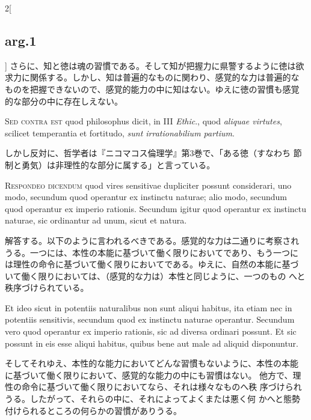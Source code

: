 \documentclass[paper=a4paper,fontsize=10pt,jafontsize=9pt,titlepage]{jlreq}
\begin{document}
\begin{paracol}{2}[\subsection{arg.1}]
さらに、知と徳は魂の習慣である。そして知が把握力に県警するように徳は欲
求力に関係する。しかし、知は普遍的なものに関わり、感覚的な力は普遍的な
ものを把握できないので、感覚的能力の中に知はない。ゆえに徳の習慣も感覚
的な部分の中に存在しえない。

\switchcolumn*[\subsection{s.c.}]

{\scshape Sed contra est} quod philosophus dicit, in III {\itshape
 Ethic}., quod {\itshape aliquae virtutes}, scilicet temperantia et
 fortitudo, {\itshape sunt irrationabilium partium}.

\switchcolumn

しかし反対に、哲学者は『ニコマコス倫理学』第3巻で、「ある徳（すなわち
 節制と勇気）は非理性的な部分に属する」と言っている。


{\scshape Respondeo dicendum} quod vires sensitivae dupliciter possunt
 considerari, uno modo, secundum quod operantur ex instinctu naturae;
 alio modo, secundum quod operantur ex imperio rationis. Secundum
 igitur quod operantur ex instinctu naturae, sic ordinantur ad unum,
 sicut et natura.

\switchcolumn

解答する。以下のように言われるべきである。感覚的な力は二通りに考察され
うる。一つには、本性の本能に基づいて働く限りにおいてであり、もう一つに
は理性の命令に基づいて働く限りにおいてである。ゆえに、自然の本能に基づ
 いて働く限りにおいては、（感覚的な力は）本性と同じように、一つのもの
 へと秩序づけられている。

\switchcolumn*

Et ideo sicut in potentiis naturalibus non sunt
 aliqui habitus, ita etiam nec in potentiis sensitivis, secundum quod
 ex instinctu naturae operantur. Secundum vero quod operantur ex
 imperio rationis, sic ad diversa ordinari possunt. Et sic possunt in
 eis esse aliqui habitus, quibus bene aut male ad aliquid disponuntur.

\switchcolumn

そしてそれゆえ、本性的な能力においてどんな習慣もないように、本性の本能
 に基づいて働く限りにおいて、感覚的な能力の中にも習慣はない。
他方で、理性の命令に基づいて働く限りにおいてなら、それは様々なものへ秩
 序づけられうる。したがって、それらの中に、それによってよくまたは悪く何
 かへと態勢付けられるところの何らかの習慣がありうる。


\end{paracol}
\end{document}

